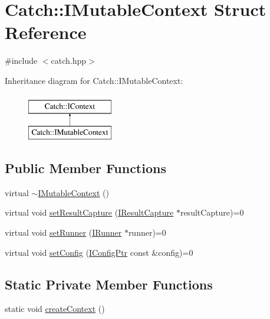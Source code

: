 \hypertarget{struct_catch_1_1_i_mutable_context}{}\section{Catch\+::I\+Mutable\+Context Struct Reference}
\label{struct_catch_1_1_i_mutable_context}


{\ttfamily \#include $<$catch.\+hpp$>$}

Inheritance diagram for Catch\+::I\+Mutable\+Context\+:\begin{figure}[H]
\begin{center}
\leavevmode
\includegraphics[height=2.000000cm]{struct_catch_1_1_i_mutable_context}
\end{center}
\end{figure}
\subsection*{Public Member Functions}
\begin{DoxyCompactItemize}
\item 
virtual \mbox{\hyperlink{struct_catch_1_1_i_mutable_context_a93f32b2ab6d0fb83637059240be799ab}{$\sim$\+I\+Mutable\+Context}} ()
\item 
virtual void \mbox{\hyperlink{struct_catch_1_1_i_mutable_context_a4a80afd0525b7def21bee8d9b48f2d39}{set\+Result\+Capture}} (\mbox{\hyperlink{struct_catch_1_1_i_result_capture}{I\+Result\+Capture}} $\ast$result\+Capture)=0
\item 
virtual void \mbox{\hyperlink{struct_catch_1_1_i_mutable_context_af2e53b1dea4527a2587cff266a730f6e}{set\+Runner}} (\mbox{\hyperlink{struct_catch_1_1_i_runner}{I\+Runner}} $\ast$runner)=0
\item 
virtual void \mbox{\hyperlink{struct_catch_1_1_i_mutable_context_aa81ba080fce084e9482f20338bc88531}{set\+Config}} (\mbox{\hyperlink{namespace_catch_afd20a5d4f9d2f4d525db81a7765367b0}{I\+Config\+Ptr}} const \&config)=0
\end{DoxyCompactItemize}
\subsection*{Static Private Member Functions}
\begin{DoxyCompactItemize}
\item 
static void \mbox{\hyperlink{struct_catch_1_1_i_mutable_context_a17e4b3f9a9674af7e2c4f081c692a628}{create\+Context}} ()
\end{DoxyCompactItemize}
